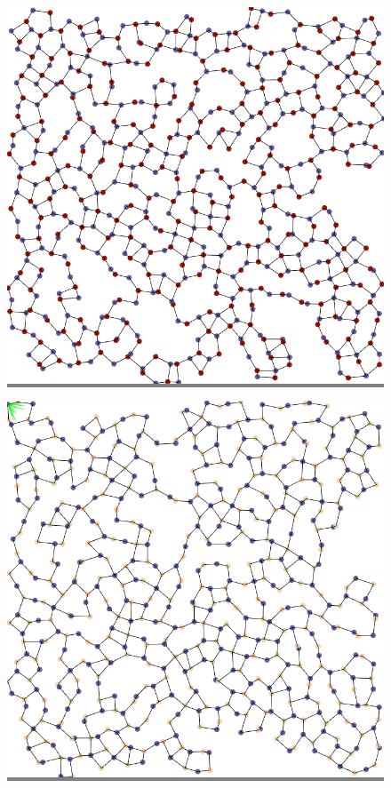\documentclass{article}
\begin{document}
\begin{figure}
\begin{minipage}{0.3\textwidth}
    \end{minipage}
    \hspace{\fill}
    \begin{minipage}{0.3\textwidth}
    \colorbox{gray}{\includegraphics[width=\linewidth]{./images/square_1_bb_0.png}}
    \end{minipage}
    \hspace{\fill}
    \begin{minipage}{0.3\textwidth}
    \colorbox{gray}{\includegraphics[width=\linewidth]{./images/square_1_bb_1.png}}

\end{minipage}
\end{figure}
\end{document}
